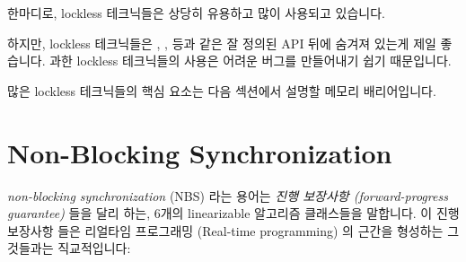 한마디로, lockless 테크닉들은 상당히 유용하고 많이 사용되고 있습니다.

하지만, lockless 테크닉들은 , ,
 등과 같은 잘 정의된 API 뒤에 숨겨져 있는게 제일 좋습니다.
과한 lockless 테크닉들의 사용은 어려운 버그를 만들어내기 쉽기 때문입니다.

많은 lockless 테크닉들의 핵심 요소는 다음 섹션에서 설명할 메모리 배리어입니다.
\iffalse

In short, lockless techniques are quite useful and are heavily used.

However, it is best if lockless techniques are hidden behind a
well-defined API, such as the \co{inc_count()}, \co{memblock_alloc()},
\co{rcu_read_lock()}, and so on.
The reason for this is that undisciplined use of lockless techniques
is a good way to create difficult bugs.

A key component of many lockless techniques is the memory barrier,
which is described in the following section.
\fi



\section{Non-Blocking Synchronization}
\label{sec:advsync:Non-Blocking Synchronization}

\emph{non-blocking synchronization} (NBS) 라는 용어는
\emph{진행 보장사항 (forward-progress guarantee)} 들을 달리 하는, 6개의
linearizable 알고리즘 클래스들을 말합니다.
이 진행 보장사항 들은 리얼타임 프로그래밍 (Real-time programming) 의 근간을
형성하는 그것들과는 직교적입니다:
\iffalse

The term \emph{non-blocking synchronization} (NBS) describes six classes of
linearizable algorithms with differing \emph{forward-progress guarantees}.
These forward-progress guarantees are orthogonal to those that form the
basis of real-time programming:
\fi

